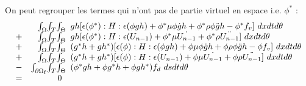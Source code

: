On peut regrouper les termes qui n'ont pas de partie virtuel en espace i.e. $\phi^*$ :
\begin{equation}
\begin{array}{r r l}
	&\int_\Omega \! \int_T \! \int_\Theta \!\!\!&		
		gh[\epsilon (\phi^*) : H : \epsilon (\phi gh)
			+ \phi^* \mu \phi\dot{g}h
			+ \phi^* \rho \phi\ddot{g}h
			- \phi^* f_v
			] ~dx dt d\theta
	\\
	+ &\int_\Omega \! \int_T \! \int_\Theta \!\!\!&		
		gh[\epsilon (\phi^*) : H : \epsilon (U_{n-1})
			+ \phi^* \mu \dot{U_{n-1}} 
			+ \phi^* \rho \ddot{U_{n-1}}
			] ~dx dt d\theta
	\\
	+ &\int_\Omega \! \int_T \! \int_\Theta \!\!\!&		
		(g^*h + gh^*)[\epsilon (\phi) : H : \epsilon ( \phi gh)
			+ \phi \mu  \phi\dot{g}h
			+ \phi \rho \phi\ddot{g}h
			- \phi f_v
			] ~dx dt d\theta
	\\
	+ &\int_\Omega \! \int_T \! \int_\Theta \!\!\!&		
		(g^*h + gh^*)[\epsilon (\phi) : H : \epsilon (U_{n-1})
			+ \phi \mu \dot{U_{n-1}}
			+ \phi \rho \ddot{U_{n-1}}
			] ~dx dt d\theta
	\\
	- &\int_{\partial \Omega_\mathbf{f}} \! \int_T \! \int_\Theta \!\!\!&
		(\phi^*gh + \phi g^*h + \phi gh^*) f_d  ~ds dt d\theta
	\\
	= &0& 
\end{array}
\end{equation}


